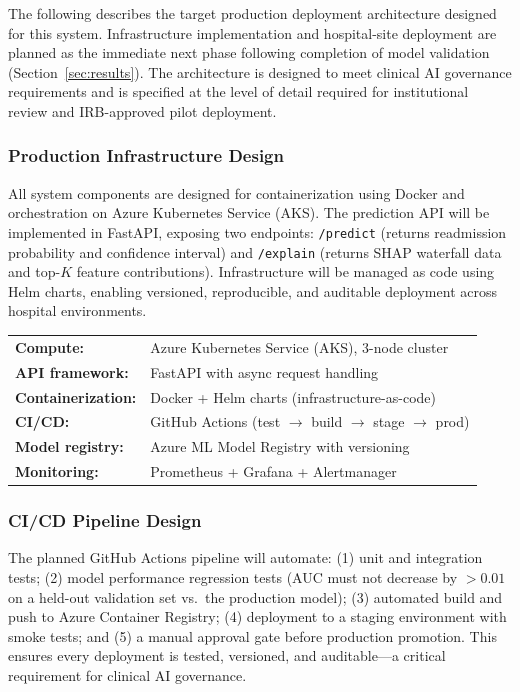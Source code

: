 \documentclass[11pt,letterpaper]{article}
\begin{document}
The following describes the target production deployment architecture designed for this system. Infrastructure implementation and hospital-site deployment are planned as the immediate next phase following completion of model validation (Section~\ref{sec:results}). The architecture is designed to meet clinical AI governance requirements and is specified at the level of detail required for institutional review and IRB-approved pilot deployment.

\subsubsection{Production Infrastructure Design}

All system components are designed for containerization using Docker and orchestration on Azure Kubernetes Service (AKS). The prediction API will be implemented in FastAPI, exposing two endpoints: \texttt{/predict} (returns readmission probability and confidence interval) and \texttt{/explain} (returns SHAP waterfall data and top-$K$ feature contributions). Infrastructure will be managed as code using Helm charts, enabling versioned, reproducible, and auditable deployment across hospital environments.

\begin{keybox}[title={Planned Deployment Stack}]
\begin{tabular}{@{}ll@{}}
\textbf{Compute:}          & Azure Kubernetes Service (AKS), 3-node cluster \\
\textbf{API framework:}    & FastAPI with async request handling \\
\textbf{Containerization:} & Docker + Helm charts (infrastructure-as-code) \\
\textbf{CI/CD:}            & GitHub Actions (test $\to$ build $\to$ stage $\to$ prod) \\
\textbf{Model registry:}   & Azure ML Model Registry with versioning \\
\textbf{Monitoring:}       & Prometheus + Grafana + Alertmanager \\
\end{tabular}
\end{keybox}

\subsubsection{CI/CD Pipeline Design}

The planned GitHub Actions pipeline will automate: (1) unit and integration tests; (2) model performance regression tests (AUC must not decrease by $> 0.01$ on a held-out validation set vs.\ the production model); (3) automated build and push to Azure Container Registry; (4) deployment to a staging environment with smoke tests; and (5) a manual approval gate before production promotion. This ensures every deployment is tested, versioned, and auditable---a critical requirement for clinical AI governance.
\end{document}

